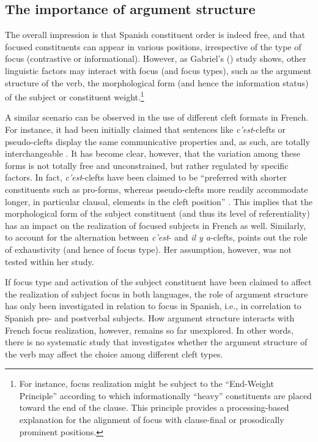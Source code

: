 \subsection{The importance of argument structure} \label{sub:3.4.1}
The overall impression is that Spanish constituent order  is  indeed  free, and  that  focused  constituents  can  appear  in  various  positions, irrespective  of  the type  of  focus  (contrastive or  informational). However, as Gabriel’s (\citeyear{gabriel2007fokus}) study shows, other linguistic factors may interact with focus (and focus types), such as the argument structure of the verb, the morphological form (and hence the information status) of the subject or constituent weight.\footnote{For instance, focus realization might be subject to the ``End-Weight Principle” \parencite{quirk1985comprehensive,hawkins1994performance,hawkins2004efficiency} according to which informationally ``heavy” constituents are placed toward the end of the clause. This principle provides a processing-based explanation for the alignment of focus with clause-final or prosodically prominent positions.} 

A similar scenario can be observed in the use of different cleft formats in French. For instance, it had been initially claimed that sentences like \textit{c’est}-clefts or pseudo-clefts display the same communicative properties and, as such, are totally interchangeable \parencite{akmajian1970deriving}. It has become clear, however, that the variation among these forms is not totally free and unconstrained, but rather regulated by specific factors. In fact, \textit{c'est}-clefts have been claimed to be “preferred with shorter constituents such as pro-forms, whereas pseudo-clefts more readily accommodate longer, in particular clausal, elements in the cleft  position” \parencite[24]{dufter201614}. This implies that the morphological form of the subject constituent (and thus its level of referentiality) has an impact on the realization of focused subjects in French as well. Similarly, to account for the alternation between \textit{c’est}- and \textit{il y a}-clefts, \textcite{karssenberg2017oiseaux} points out the role of exhaustivity (and hence of focus type). Her assumption, however, was not tested within her study.

If focus type and activation of the subject constituent have been claimed to affect the realization of subject focus in both languages, the role of argument structure has only been investigated in relation to focus in Spanish, i.e., in correlation to Spanish pre- and postverbal subjects. How argument structure interacts with French focus realization, however, remains so far unexplored. In other words, there is no systematic study that investigates whether the argument structure of the verb may affect the choice among different cleft types.

